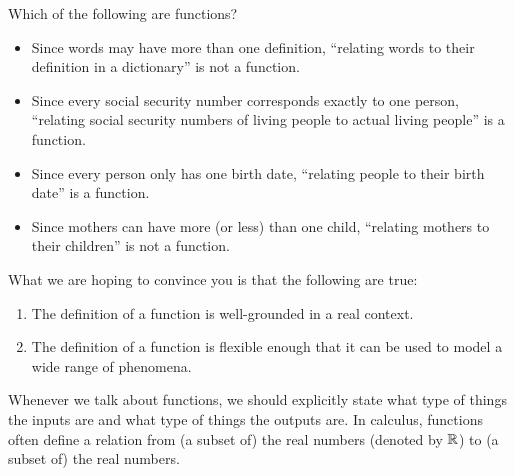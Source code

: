 \documentclass{ximera}
\begin{document}
\begin{question}
  Which of the following are functions?
  \begin{selectAll}
  \end{selectAll}
  \begin{feedback}\hfil
    \begin{itemize}
    \item Since words may have more than one definition, ``relating
      words to their definition in a dictionary'' is not a function.
    \item Since every social security number corresponds exactly to
      one person, ``relating social security numbers of living people
      to actual living people'' is a function.
    \item Since every person only has one birth date, ``relating
      people to their birth date'' is a function.
      \item Since mothers can have more (or less) than one child,
        ``relating mothers to their children'' is not a function.
    \end{itemize}
  \end{feedback}
\end{question}

What we are hoping to convince you is that the following are true:
\begin{enumerate}
\item The definition of a function is well-grounded in a real context.
\item The definition of a function is flexible enough that it can be
  used to model a wide range of phenomena.
\end{enumerate}






Whenever we talk about functions, we should explicitly state
what type of things the inputs are and what type of things the outputs
are.  In calculus, functions often define a relation from (a subset
of) the real numbers (denoted by $\mathbb R$) to (a subset of) the real
numbers.
\end{document}

